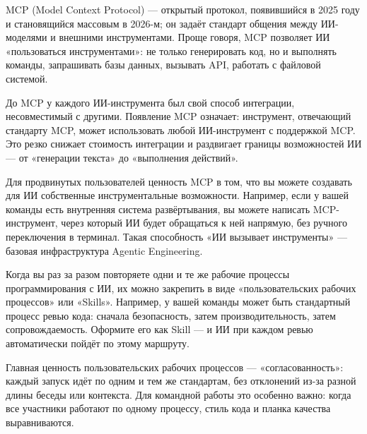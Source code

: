 


MCP (Model Context Protocol) — открытый протокол, появившийся в 2025 году и становящийся массовым в 2026-м; он задаёт стандарт общения между ИИ-моделями и внешними инструментами. Проще говоря, MCP позволяет ИИ «пользоваться инструментами»: не только генерировать код, но и выполнять команды, запрашивать базы данных, вызывать API, работать с файловой системой.

До MCP у каждого ИИ-инструмента был свой способ интеграции, несовместимый с другими. Появление MCP означает: инструмент, отвечающий стандарту MCP, может использовать любой ИИ-инструмент с поддержкой MCP. Это резко снижает стоимость интеграции и раздвигает границы возможностей ИИ — от «генерации текста» до «выполнения действий».

Для продвинутых пользователей ценность MCP в том, что вы можете создавать для ИИ собственные инструментальные возможности. Например, если у вашей команды есть внутренняя система развёртывания, вы можете написать MCP-инструмент, через который ИИ будет обращаться к ней напрямую, без ручного переключения в терминал. Такая способность «ИИ вызывает инструменты» — базовая инфраструктура Agentic Engineering.


Когда вы раз за разом повторяете одни и те же рабочие процессы программирования с ИИ, их можно закрепить в виде «пользовательских рабочих процессов» или «Skills». Например, у вашей команды может быть стандартный процесс ревью кода: сначала безопасность, затем производительность, затем сопровождаемость. Оформите его как Skill — и ИИ при каждом ревью автоматически пойдёт по этому маршруту.

Главная ценность пользовательских рабочих процессов — «согласованность»: каждый запуск идёт по одним и тем же стандартам, без отклонений из-за разной длины беседы или контекста. Для командной работы это особенно важно: когда все участники работают по одному процессу, стиль кода и планка качества выравниваются.

